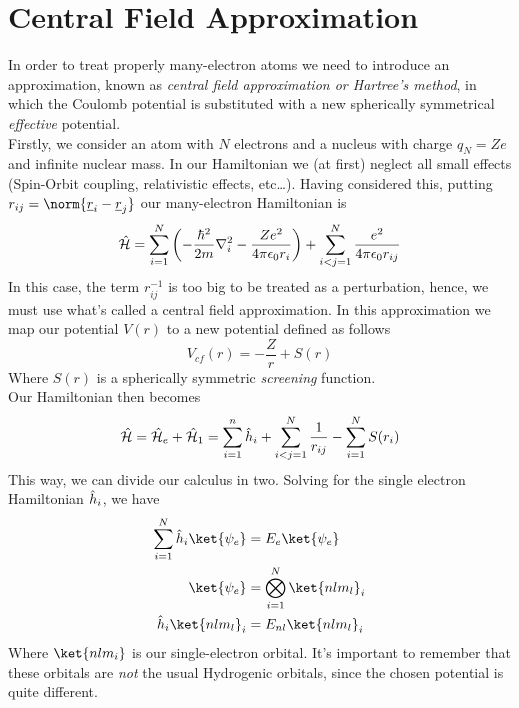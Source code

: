 \documentclass[../qm.tex]{subfiles}
\begin{document}
	\section{Central Field Approximation}
	In order to treat properly many-electron atoms we need to introduce an approximation, known as \textit{central field approximation or Hartree's method}, in which the Coulomb potential is substituted with a new spherically symmetrical \textit{effective} potential.\\
	Firstly, we consider an atom with $N$ electrons and a nucleus with charge $q_N=Ze$ and infinite nuclear mass. In our Hamiltonian we (at first) neglect all small effects (Spin-Orbit coupling, relativistic effects, etc\ldots). Having considered this, putting $r_{ij}=\norm{\vec{r}_i-\vec{r}_j}$ our many-electron Hamiltonian is
	\begin{equation}
		\hat{\mathcal{H}}=\sum_{i=1}^N\left( -\frac{\hbar^2}{2m}\nabla^2_i-\frac{Ze^2}{4\pi\epsilon_0r_i} \right)+\sum_{i<j=1}^N\frac{e^2}{4\pi\epsilon_0r_{ij}}
		\label{eq:manyelectronhamiltonianatomic}
	\end{equation}
	In this case, the term $r_{ij}^{-1}$ is too big to be treated as a perturbation, hence, we must use what's called a central field approximation. In this approximation we map our potential $V(r)$ to a new potential defined as follows
	\begin{equation}
		V_{cf}(r)=-\frac{Z}{r}+S(r)
		\label{eq:newpotential}
	\end{equation}
	Where $S(r)$ is a spherically symmetric \textit{screening} function.\\
	Our Hamiltonian then becomes
	\begin{equation}
		\hat{\mathcal{H}}=\hat{\mathcal{H}}_e+\hat{\mathcal{H}}_1=\sum_{i=1}^n\hat{h}_i+\sum_{i<j=1}^N\frac{1}{r_{ij}}-\sum_{i=1}^NS(r_i)
		\label{eq:hartreehamiltonian}
	\end{equation}
	This way, we can divide our calculus in two. Solving for the single electron Hamiltonian $\hat{h}_i$, we have
	\begin{equation}
		\begin{aligned}
			\sum_{i=1}^N\opr{h}_i\ket{\psi_e}&=E_e\ket{\psi_e}\\
			\ket{\psi_e}&=\bigotimes_{i=1}^N\ket{nlm_l}_i\\
			\opr{h}_i\ket{nlm_l}_i&=E_{nl}\ket{nlm_l}_i
		\end{aligned}
		\label{eq:hartreeapprox}
	\end{equation}
	Where $\ket{nlm_i}$ is our single-electron orbital. It's important to remember that these orbitals are \emph{not} the usual Hydrogenic orbitals, since the chosen potential is quite different.\\
\end{document}
